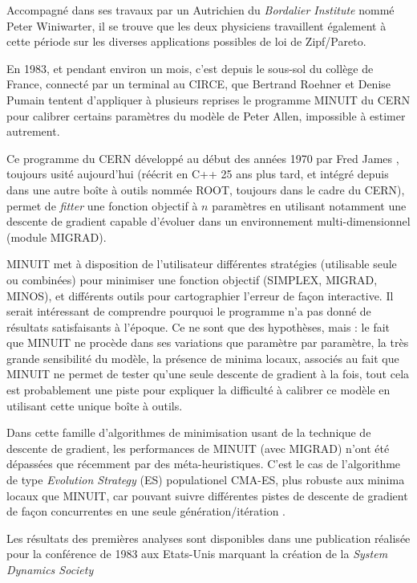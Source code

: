 Accompagné dans ses travaux par un Autrichien du \textit{Bordalier Institute} nommé Peter Winiwarter, il se trouve que les deux physiciens travaillent également à cette période sur les diverses applications possibles de loi de Zipf/Pareto.

En 1983, et pendant environ un mois, c’est depuis le sous-sol du collège de France, connecté par un terminal au CIRCE, que Bertrand Roehner et Denise Pumain tentent d’appliquer à plusieurs reprises le programme MINUIT du CERN pour calibrer certains paramètres du modèle de Peter Allen, impossible à estimer autrement.

Ce programme du CERN développé au début des années 1970 par Fred James \autocite{James1972}, toujours usité aujourd’hui (réécrit en C++ 25 ans plus tard, et intégré depuis dans une autre boîte à outils nommée ROOT, toujours dans le cadre du CERN), permet de \textit{fitter} une fonction objectif à $n$ paramètres en utilisant notamment une descente de gradient capable d’évoluer dans un environnement multi-dimensionnel (module MIGRAD).

MINUIT met à disposition de l’utilisateur différentes stratégies (utilisable seule ou combinées) pour minimiser une fonction objectif (SIMPLEX, MIGRAD, MINOS), et différents outils pour cartographier l’erreur de façon interactive.  Il serait intéressant de comprendre pourquoi le programme n’a pas donné de résultats satisfaisants à l’époque. Ce ne sont que des hypothèses, mais : le fait que MINUIT ne procède dans ses variations que paramètre par paramètre, la très grande sensibilité du modèle, la présence de minima locaux, associés au fait que MINUIT ne permet de tester qu’une seule descente de gradient à la fois, tout cela est probablement une piste pour expliquer la difficulté à calibrer ce modèle en utilisant cette unique boîte à outils.

Dans cette famille d’algorithmes de minimisation usant de la technique de descente de gradient, les performances de MINUIT (avec MIGRAD) n’ont été dépassées que récemment par des méta-heuristiques. C’est le cas de l’algorithme de type \textit{Evolution Strategy} (ES) populationel CMA-ES, plus robuste aux minima locaux que MINUIT, car pouvant suivre différentes pistes de descente de gradient de façon concurrentes en une seule génération/itération \autocite{Berlich2003}.

Les résultats des premières analyses sont disponibles dans une publication \autocite{Pumain1983b} réalisée pour la conférence de 1983 aux Etats-Unis marquant la création \autocite{Andersen2007} de la \textit{System Dynamics Society}

